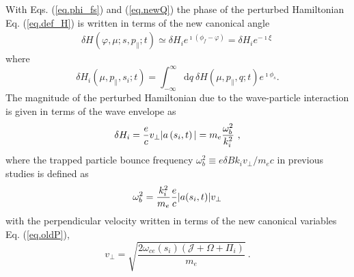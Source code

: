 With Eqs. (\ref{eq.phi_fs}) 
and (\ref{eq.newQ})
the phase of the perturbed Hamiltonian
Eq. (\ref{eq.def_H}) is written  in terms of the new canonical angle
\begin{equation}\label{eq.kernel_H}
    \begin{aligned}
        \delta H(\varphi,\mu;s,p_\|;t)  \simeq \delta H_i e^{\imath\left(\phi_{f}-\varphi\right)}=\delta H_i e^{-\imath \xi}~
    \end{aligned}
\end{equation}
where  
\begin{equation}
        \delta H_i\left(\mu, p_\|, s_i; t\right)=\int_{-\infty}^{\infty} \mathrm{d} q~ \delta H\left(\mu, p_\|, q ; t\right)  e^{\imath \phi_{s}}. 
\end{equation}
The magnitude of the perturbed Hamiltonian due to the wave-particle interaction  
is given in terms of the  wave envelope as 
\begin{equation}
\delta H_i={e \over c} v_{\perp}|a\left(s_{i}, t\right)| = m_e \frac{\omega_b^2}{k_i^2}~,
\end{equation}
where the trapped particle bounce frequency 
$\omega_b^2 \equiv e \delta B  k_i v_\perp / m_e c$ in previous studies 
\cite{omura_theory_2008,sudan_theory_1971,tao_theoretical_2020} 
is defined as
\begin{equation}
    \omega_b^2 %
    = \frac{k_{i}^2 }{m_e } {e\over c} |a(s_{i}, t)| v_\perp  
\end{equation}
with  
the perpendicular velocity written in terms of the new canonical variables Eq. (\ref{eq.oldP}),
\begin{equation}
 v_\perp =\sqrt{\frac{2\omega_{ce}\left(s_{i}\right)\left(\mathcal{J}+\Omega+\Pi_{i}\right)}{m_e}} ~.
\end{equation}




